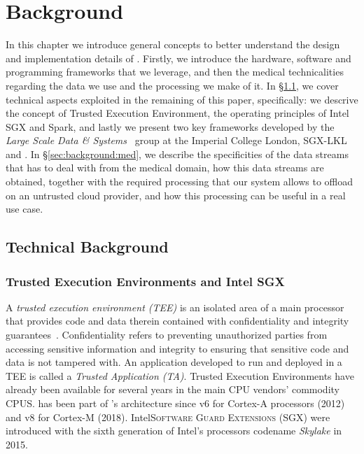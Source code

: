 \chapter{Background} \label{chap:background}

In this chapter we introduce general concepts to better understand the design and implementation details of \projName.
Firstly, we introduce the hardware, software and programming frameworks that we leverage, and then the medical technicalities regarding the data we use and the processing we make of it.
In \S\ref{sec:background:tech}, we cover technical aspects exploited in the remaining of this paper, specifically: we descrive the concept of Trusted Execution Environment, the operating principles of Intel SGX and Spark, and lastly we present two key frameworks developed by the \textit{Large Scale Data \& Systems}~\cite{lsds} group at the Imperial College London, \textsc{SGX-LKL} and \sgxspark.
In \S\ref{sec:background:med}, we describe the specificities of the data streams that \projName has to deal with from the medical domain, how this data streams are obtained, together with the required processing that our system allows to offload on an untrusted cloud provider, and how this processing can be useful in a real use case.

\section{Technical Background} \label{sec:background:tech}

\subsection{Trusted Execution Environments and Intel SGX}
A \emph{trusted execution environment (TEE)} is an isolated area of a main processor that provides code and data therein contained with confidentiality and integrity guarantees~\cite{tee-globalplatform}. 
Confidentiality refers to preventing unauthorized parties from accessing sensitive information and integrity to ensuring that sensitive code and data is not tampered with.
An application developed to run and deployed in a TEE is called a \emph{Trusted Application (TA)}.
Trusted Execution Environments have already been available for several years in the main CPU vendors' commodity CPUS.
\arm \tz has been part of \arm's architecture since v6 for Cortex-A processors (2012) and v8 for Cortex-M (2018).
Intel\textregistered\xspace \textsc{Software Guard Extensions (SGX)} were introduced with the sixth generation of Intel's processors codename \textit{Skylake} in 2015.

